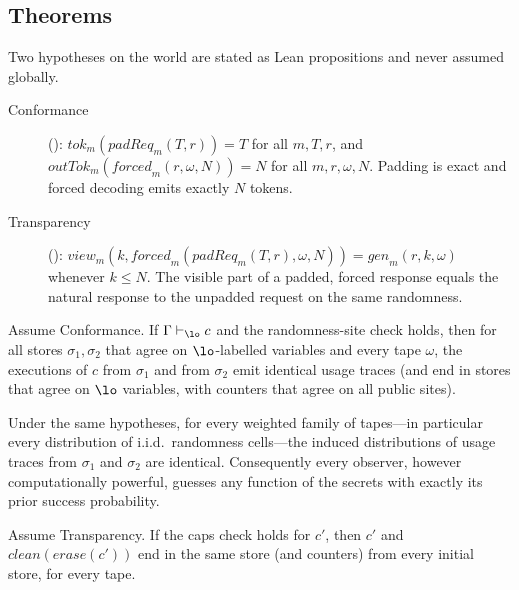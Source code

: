 \subsection{Theorems}\label{sec:theorems}

Two hypotheses on the world are stated as Lean propositions and never assumed globally.
\begin{description}
\item[Conformance] (): $\mathit{tok}_m(\mathit{padReq}_m(T, r)) = T$ for all $m, T, r$, and $\mathit{outTok}_m(\mathit{forced}_m(r, \omega, N)) = N$ for all $m, r, \omega, N$. Padding is exact and forced decoding emits exactly $N$ tokens.
\item[Transparency] (): $\mathit{view}_m(k, \mathit{forced}_m(\mathit{padReq}_m(T, r), \omega, N)) = \mathit{gen}_m(r, k, \omega)$ whenever $k \le N$. The visible part of a padded, forced response equals the natural response to the unpadded request on the same randomness.
\end{description}

\begin{theorem}\label{thm:ni}
Assume Conformance. If $\Gamma \vdash_{\lo} c$ and the randomness-site check holds, then for all stores $\sigma_1, \sigma_2$ that agree on $\lo$-labelled variables and every tape $\omega$, the executions of $c$ from $\sigma_1$ and from $\sigma_2$ emit identical usage traces (and end in stores that agree on $\lo$ variables, with counters that agree on all public sites).
\end{theorem}

\begin{corollary}
Under the same hypotheses, for every weighted family of tapes---in particular every distribution of i.i.d.\ randomness cells---the induced distributions of usage traces from $\sigma_1$ and $\sigma_2$ are identical. Consequently every observer, however computationally powerful, guesses any function of the secrets with exactly its prior success probability.
\end{corollary}

\begin{theorem}\label{thm:erase}
Assume Transparency. If the caps check holds for $c'$, then $c'$ and $\mathit{clean}(\mathit{erase}(c'))$ end in the same store (and counters) from every initial store, for every tape.
\end{theorem}

